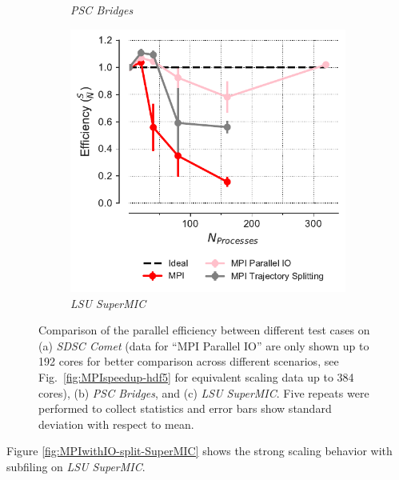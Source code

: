 \begin{figure}[!htb]
\begin{subfigure}{.35\textwidth}
    \caption{\emph{PSC Bridges}}
    \label{fig:comparison_efficiency_Bridges}
  \end{subfigure}
  \hfill
  \begin{subfigure}{.3\textwidth}
    \includegraphics[width=\linewidth]{figures/Comparison_Efficiency_all_SuperMIC.pdf}
    \caption{\emph{LSU SuperMIC}}
    \label{fig:comparison_efficiency_SuperMIC}
  \end{subfigure}
  \caption{Comparison of the parallel efficiency between different test cases on (a) \emph{SDSC Comet} (data for ``MPI Parallel IO'' are only shown up to 192 cores for better comparison across different scenarios, see Fig.~\protect\ref{fig:MPIspeedup-hdf5} for equivalent scaling data up to 384 cores), (b) \emph{PSC Bridges}, and (c) \emph{LSU SuperMIC}.
    Five repeats were performed to collect statistics and error bars show standard deviation with respect to mean.}
  \label{fig:comparison_efficiency_clusters}
\end{figure} 

Figure \ref{fig:MPIwithIO-split-SuperMIC} shows the strong scaling behavior with subfiling on \emph{LSU SuperMIC}.  
 
